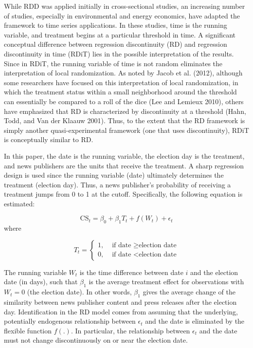 \documentclass[
  12pt,
]{article}
\begin{document}
While RDD was applied initially in cross-sectional studies, an
increasing number of studies, especially in environmental and energy
economics, have adapted the framework to time series applications. In
these studies, time is the running variable, and treatment begins at a
particular threshold in time. A significant conceptual difference
between regression discontinuity (RD) and regression discontinuity in
time (RDiT) lies in the possible interpretation of the results. Since in
RDiT, the running variable of time is not random eliminates the
interpretation of local randomization. As noted by Jacob et al. (2012),
although some researchers have focused on this interpretation of local
randomization, in which the treatment status within a small neighborhood
around the threshold can essentially be compared to a roll of the dice
(Lee and Lemieux 2010), others have emphasized that RD is characterized
by discontinuity at a threshold (Hahn, Todd, and Van der Klaauw 2001).
Thus, to the extent that the RD framework is simply another
quasi-experimental framework (one that uses discontinuity), RDiT is
conceptually similar to RD.

In this paper, the date is the running variable, the election day is the
treatment, and news publishers are the units that receive the treatment.
A sharp regression design is used since the running variable (date)
ultimately determines the treatment (election day). Thus, a news
publisher's probability of receiving a treatment jumps from 0 to 1 at
the cutoff. Specifically, the following equation is estimated:

\[
\text{CS}_{t}=\beta_0+\beta_1T_t+f(W_t)+\epsilon_t
\] where

\[
T_t = 
\begin{cases}
1, & \text{ if date } \geq \text{election date} \\
0, & \text{ if date } < \text{election date}
\end{cases}
\]

The running variable \(W_t\) is the time difference between date \(i\)
and the election date (in days), such that \(\beta_1\) is the average
treatment effect for observations with \(W_t = 0\) (the election date).
In other words, \(\beta_1\) gives the average change of the similarity
between news publisher content and press releases after the election
day. Identification in the RD model comes from assuming that the
underlying, potentially endogenous relationship between \(\epsilon_t\)
and the date is eliminated by the flexible function \(f(.)\). In
particular, the relationship between \(\epsilon_t\) and the date must
not change discontinuously on or near the election date.
\end{document}
